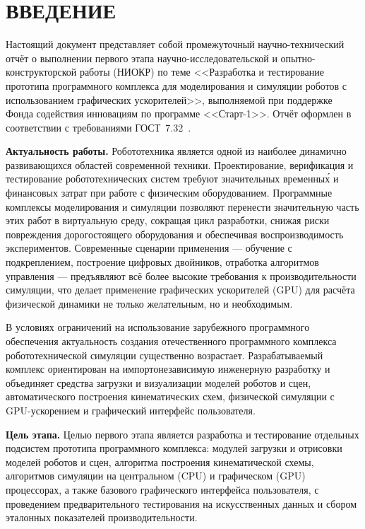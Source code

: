 \chapter*{ВВЕДЕНИЕ}

Настоящий документ представляет собой промежуточный научно-технический отчёт о
выполнении первого этапа научно-исследовательской и опытно-конструкторской
работы (НИОКР) по теме <<Разработка и тестирование прототипа программного
комплекса для моделирования и симуляции роботов с использованием графических
ускорителей>>, выполняемой при поддержке Фонда содействия инновациям по
программе <<Старт-1>>. Отчёт оформлен в соответствии с требованиями
ГОСТ~7.32~\cite{gost732}.

\textbf{Актуальность работы.}
Робототехника является одной из наиболее динамично развивающихся областей
современной техники. Проектирование, верификация и тестирование
робототехнических систем требуют значительных временны\'{х} и финансовых затрат
при работе с физическим оборудованием. Программные комплексы моделирования и
симуляции позволяют перенести значительную часть этих работ в виртуальную среду,
сокращая цикл разработки, снижая риски повреждения дорогостоящего оборудования и
обеспечивая воспроизводимость экспериментов. Современные сценарии применения ---
обучение с подкреплением, построение цифровых двойников, отработка алгоритмов
управления --- предъявляют всё более высокие требования к производительности
симуляции, что делает применение графических ускорителей (GPU) для расчёта
физической динамики не только желательным, но и необходимым.

В условиях ограничений на использование зарубежного программного обеспечения
актуальность создания отечественного программного комплекса робототехнической
симуляции существенно возрастает. Разрабатываемый комплекс ориентирован на
импортонезависимую инженерную разработку и объединяет средства загрузки и
визуализации моделей роботов и сцен, автоматического построения кинематических
схем, физической симуляции с GPU-ускорением и графический интерфейс
пользователя.

\textbf{Цель этапа.}
Целью первого этапа является разработка и тестирование отдельных подсистем
прототипа программного комплекса: модулей загрузки и отрисовки моделей роботов и
сцен, алгоритма построения кинематической схемы, алгоритмов симуляции на
центральном (CPU) и графическом (GPU) процессорах, а также базового графического
интерфейса пользователя, с проведением предварительного тестирования на
искусственных данных и сбором эталонных показателей производительности.

